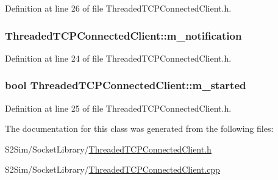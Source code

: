 Definition at line 26 of file Threaded\-T\-C\-P\-Connected\-Client.\-h.

\hypertarget{class_threaded_t_c_p_connected_client_a2e4475f9a13d5cfbc34c28449789ef25}{
\subsubsection[{m\-\_\-notification}]{ Threaded\-T\-C\-P\-Connected\-Client\-::m\-\_\-notification\hspace{0.3cm}{\ttfamily [private]}}}\label{class_threaded_t_c_p_connected_client_a2e4475f9a13d5cfbc34c28449789ef25}


Definition at line 24 of file Threaded\-T\-C\-P\-Connected\-Client.\-h.

\hypertarget{class_threaded_t_c_p_connected_client_ada47374bbca328b7eb6f187af10b32a0}{
\subsubsection[{m\-\_\-started}]{\setlength{\rightskip}{0pt plus 5cm}bool Threaded\-T\-C\-P\-Connected\-Client\-::m\-\_\-started\hspace{0.3cm}{\ttfamily [private]}}}\label{class_threaded_t_c_p_connected_client_ada47374bbca328b7eb6f187af10b32a0}


Definition at line 25 of file Threaded\-T\-C\-P\-Connected\-Client.\-h.



The documentation for this class was generated from the following files\-:\begin{DoxyCompactItemize}
\item 
S2\-Sim/\-Socket\-Library/\hyperlink{_threaded_t_c_p_connected_client_8h}{Threaded\-T\-C\-P\-Connected\-Client.\-h}\item 
S2\-Sim/\-Socket\-Library/\hyperlink{_threaded_t_c_p_connected_client_8cpp}{Threaded\-T\-C\-P\-Connected\-Client.\-cpp}\end{DoxyCompactItemize}
